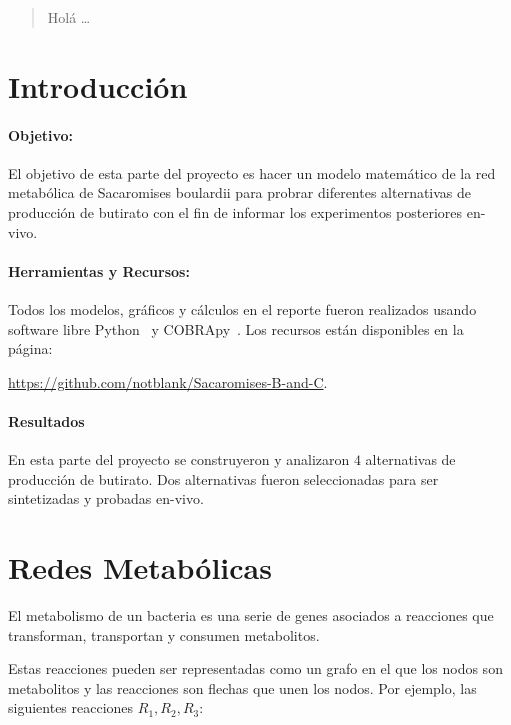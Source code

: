 \documentclass[12pt,spanish]{article}
\begin{document}
\maketitle

\begin{abstract}
Holá \ldots
\end{abstract}

\section{Introducción}

\paragraph{Objetivo:} El objetivo de esta parte del proyecto es hacer un modelo matemático de la red metabólica de Sacaromises boulardii para probrar diferentes alternativas de producción de butirato con el fin de informar los experimentos posteriores en-vivo.

\paragraph{Herramientas y Recursos:} Todos los modelos, gráficos y cálculos en el reporte fueron realizados usando software libre Python~\cite{python} y COBRApy~\cite{COBRApy}. Los recursos están disponibles en la página:

\begin{center}
  \href{https://github.com/notblank/Sacaromises-B-and-C}{https://github.com/notblank/Sacaromises-B-and-C}.
\end{center}

\paragraph{Resultados}
En esta parte del proyecto se construyeron y analizaron $4$ alternativas de producción de butirato. Dos alternativas fueron seleccionadas para ser sintetizadas y probadas en-vivo.

\section{Redes Metabólicas}
El metabolismo de un bacteria es una serie de genes asociados a reacciones que transforman, transportan y consumen metabolitos.

\par
Estas reacciones pueden ser representadas como un grafo en el que los nodos son metabolitos y las reacciones son flechas que unen los nodos. Por ejemplo, las siguientes reacciones $R_1, R_2, R_3$:
\end{document}
